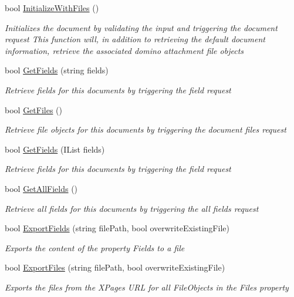 \begin{DoxyCompactItemize}
bool \mbox{\hyperlink{class_document_object_a83f0e855adc5fb7afd02d2e34767f5c8}{Initialize\+With\+Files}} ()
\begin{DoxyCompactList}\small\item\em Initializes the document by validating the input and triggering the document request This function will, in addition to retrieving the default document information, retrieve the associated domino attachment file objects \end{DoxyCompactList}\item 
bool \mbox{\hyperlink{class_document_object_a8883fec3b5b1b6e2e43f4b5ca4092684}{Get\+Fields}} (string fields)
\begin{DoxyCompactList}\small\item\em Retrieve fields for this documents by triggering the field request \end{DoxyCompactList}\item 
bool \mbox{\hyperlink{class_document_object_a2c8aee9450e8fdd1e84e8ff26d0950a1}{Get\+Files}} ()
\begin{DoxyCompactList}\small\item\em Retrieve file objects for this documents by triggering the document files request \end{DoxyCompactList}\item 
bool \mbox{\hyperlink{class_document_object_a8e38704e02850b2480d29d184ae2c0e0}{Get\+Fields}} (I\+List fields)
\begin{DoxyCompactList}\small\item\em Retrieve fields for this documents by triggering the field request \end{DoxyCompactList}\item 
bool \mbox{\hyperlink{class_document_object_a5e070c7c0a45ac06422ee992c841e780}{Get\+All\+Fields}} ()
\begin{DoxyCompactList}\small\item\em Retrieve all fields for this documents by triggering the all fields request \end{DoxyCompactList}\item 
bool \mbox{\hyperlink{class_document_object_a1a763aa01710b370634f46c89b7d2d8e}{Export\+Fields}} (string file\+Path, bool overwrite\+Existing\+File)
\begin{DoxyCompactList}\small\item\em Exports the content of the property \textquotesingle{}Fields\textquotesingle{} to a file \end{DoxyCompactList}\item 
bool \mbox{\hyperlink{class_document_object_a8753abc5a871bf84fc910e6a99936b2b}{Export\+Files}} (string file\+Path, bool overwrite\+Existing\+File)
\begin{DoxyCompactList}\small\item\em Exports the files from the X\+Pages U\+RL for all File\+Objects in the Files property \end{DoxyCompactList}\end{DoxyCompactItemize}
